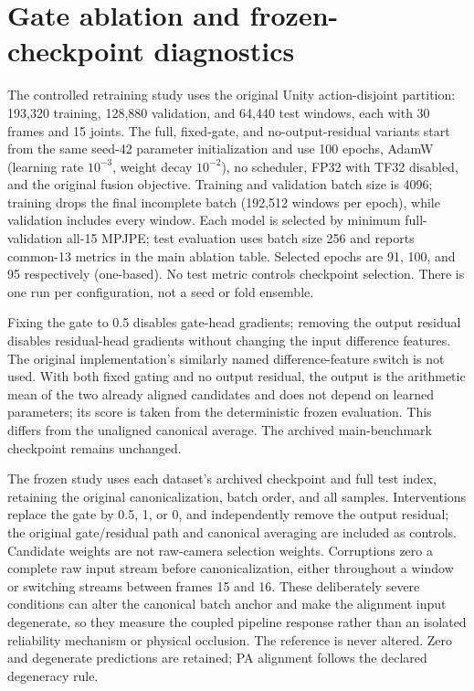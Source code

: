 \documentclass[11pt,letterpaper]{article}
\begin{document}
\FloatBarrier
\section{Gate ablation and frozen-checkpoint diagnostics}
\label{sec:gate_audit}
The controlled retraining study uses the original Unity action-disjoint partition: 193,320 training, 128,880 validation, and 64,440 test windows, each with 30 frames and 15 joints. The full, fixed-gate, and no-output-residual variants start from the same seed-42 parameter initialization and use 100 epochs, AdamW (learning rate $10^{-3}$, weight decay $10^{-2}$), no scheduler, FP32 with TF32 disabled, and the original fusion objective. Training and validation batch size is 4096; training drops the final incomplete batch (192,512 windows per epoch), while validation includes every window. Each model is selected by minimum full-validation all-15 MPJPE; test evaluation uses batch size 256 and reports common-13 metrics in the main ablation table. Selected epochs are 91, 100, and 95 respectively (one-based). No test metric controls checkpoint selection. There is one run per configuration, not a seed or fold ensemble.

Fixing the gate to 0.5 disables gate-head gradients; removing the output residual disables residual-head gradients without changing the input difference features. The original implementation's similarly named difference-feature switch is not used. With both fixed gating and no output residual, the output is the arithmetic mean of the two already aligned candidates and does not depend on learned parameters; its score is taken from the deterministic frozen evaluation. This differs from the unaligned canonical average. The archived main-benchmark checkpoint remains unchanged.



The frozen study uses each dataset's archived checkpoint and full test index, retaining the original canonicalization, batch order, and all samples. Interventions replace the gate by 0.5, 1, or 0, and independently remove the output residual; the original gate/residual path and canonical averaging are included as controls. Candidate weights are not raw-camera selection weights. Corruptions zero a complete raw input stream before canonicalization, either throughout a window or switching streams between frames 15 and 16. These deliberately severe conditions can alter the canonical batch anchor and make the alignment input degenerate, so they measure the coupled pipeline response rather than an isolated reliability mechanism or physical occlusion. The reference is never altered. Zero and degenerate predictions are retained; PA alignment follows the declared degeneracy rule.
\end{document}

